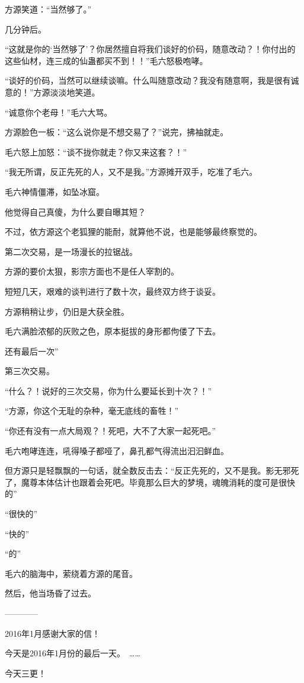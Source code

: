 \begin{this_body}
方源笑道：“当然够了。”

几分钟后。

“这就是你的‘当然够了’？你居然擅自将我们谈好的价码，随意改动？！你付出的这些仙材，连三成的仙蛊都买不到！！”毛六怒极咆哮。

“谈好的价码，当然可以继续谈嘛。什么叫随意改动？我没有随意啊，我是很有诚意的！”方源淡淡地笑道。

“诚意你个老母！”毛六大骂。

方源脸色一板：“这么说你是不想交易了？”说完，拂袖就走。

毛六怒上加怒：“谈不拢你就走？你又来这套？！”

“我无所谓，反正先死的人，又不是我。”方源摊开双手，吃准了毛六。

毛六神情僵滞，如坠冰窟。

他觉得自己真傻，为什么要自曝其短？

不过，依方源这个老狐狸的能耐，就算他不说，也是能够最终察觉的。

第二次交易，是一场漫长的拉锯战。

方源的要价太狠，影宗方面也不是任人宰割的。

短短几天，艰难的谈判进行了数十次，最终双方终于谈妥。

方源稍稍让步，仍旧是大获全胜。

毛六满脸浓郁的灰败之色，原本挺拔的身形都佝偻了下去。

还有最后一次”

第三次交易。

“什么？！说好的三次交易，你为什么要延长到十次？！”

“方源，你这个无耻的杂种，毫无底线的畜牲！”

“你还有没有一点大局观？！死吧，大不了大家一起死吧。”

毛六咆哮连连，吼得嗓子都哑了，鼻孔都气得流出汩汩鲜血。

但方源只是轻飘飘的一句话，就全数反击去：“反正先死的，又不是我。影无邪死了，魔尊本体估计也跟着会死吧。毕竟那么巨大的梦境，魂魄消耗的度可是很快的”

“很快的”

“快的”

“的”

毛六的脑海中，萦绕着方源的尾音。

然后，他当场昏了过去。

------------

2016年1月感谢大家的信！

今天是2016年1月份的最后一天。　……

今天三更！


\end{this_body}

